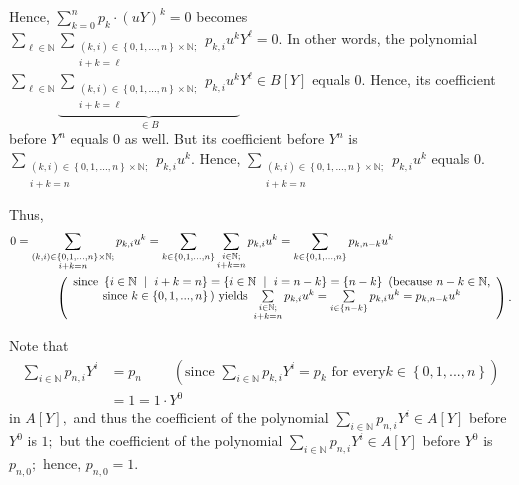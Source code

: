 \documentclass[12pt,final,notitlepage,onecolumn]{article}%
\begin{document}
Hence, $\sum\limits_{k=0}^{n}p_{k}\cdot\left(  uY\right)  ^{k}=0$ becomes
$\sum\limits_{\ell\in\mathbb{N}}\sum\limits_{\substack{\left(  k,i\right)
\in\left\{  0,1,...,n\right\}  \times\mathbb{N};\\i+k=\ell}}p_{k,i}%
u^{k}Y^{\ell}=0$. In other words, the polynomial $\sum\limits_{\ell
\in\mathbb{N}}\underbrace{\sum\limits_{\substack{\left(  k,i\right)
\in\left\{  0,1,...,n\right\}  \times\mathbb{N};\\i+k=\ell}}p_{k,i}u^{k}}_{\in
B}Y^{\ell}\in B\left[  Y\right]  $ equals $0$. Hence, its coefficient before
$Y^{n}$ equals $0$ as well. But its coefficient before $Y^{n}$ is
$\sum\limits_{\substack{\left(  k,i\right)  \in\left\{  0,1,...,n\right\}
\times\mathbb{N};\\i+k=n}}p_{k,i}u^{k}$. Hence, $\sum
\limits_{\substack{\left(  k,i\right)  \in\left\{  0,1,...,n\right\}
\times\mathbb{N};\\i+k=n}}p_{k,i}u^{k}$ equals $0$.

Thus,%
\begin{align*}
0  &  =\sum\limits_{\substack{\left(  k,i\right)  \in\left\{
0,1,...,n\right\}  \times\mathbb{N};\\i+k=n}}p_{k,i}u^{k}=\sum\limits_{k\in
\left\{  0,1,...,n\right\}  }\sum_{\substack{i\in\mathbb{N};\\i+k=n}%
}p_{k,i}u^{k}=\sum\limits_{k\in\left\{  0,1,...,n\right\}  }p_{k,n-k}u^{k}\\
&  \ \ \ \ \ \ \ \ \ \ \left(
\begin{array}
[c]{c}%
\text{since }\left\{  i\in\mathbb{N}\text{\ }\mid\ i+k=n\right\}  =\left\{
i\in\mathbb{N}\ \mid\ i=n-k\right\}  =\left\{  n-k\right\}  \text{ (because
}n-k\in\mathbb{N}\text{,}\\
\text{since }k\in\left\{  0,1,...,n\right\}  \text{) yields }\sum
\limits_{\substack{i\in\mathbb{N};\\i+k=n}}p_{k,i}u^{k}=\sum\limits_{i\in
\left\{  n-k\right\}  }p_{k,i}u^{k}=p_{k,n-k}u^{k}%
\end{array}
\right)  .
\end{align*}


Note that%
\begin{align*}
\sum\limits_{i\in\mathbb{N}}p_{n,i}Y^{i}  &  =p_{n}\ \ \ \ \ \ \ \ \ \ \left(
\text{since }\sum\limits_{i\in\mathbb{N}}p_{k,i}Y^{i}=p_{k}\text{ for every
}k\in\left\{  0,1,...,n\right\}  \right) \\
&  =1=1\cdot Y^{0}%
\end{align*}
in $A\left[  Y\right]  ,$ and thus the coefficient of the polynomial
$\sum\limits_{i\in\mathbb{N}}p_{n,i}Y^{i}\in A\left[  Y\right]  $ before
$Y^{0}$ is $1;$ but the coefficient of the polynomial $\sum\limits_{i\in
\mathbb{N}}p_{n,i}Y^{i}\in A\left[  Y\right]  $ before $Y^{0}$ is $p_{n,0};$
hence, $p_{n,0}=1$.
\end{document}
